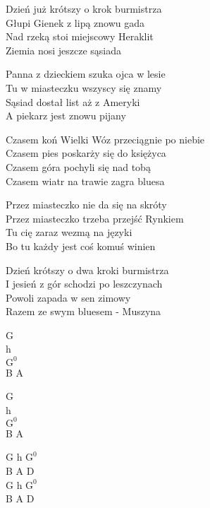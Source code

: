\begin{text}
    Dzień już krótszy o krok burmistrza\\
    Głupi Gienek z lipą znowu gada\\
    Nad rzeką stoi miejscowy Heraklit\\
    Ziemia nosi jeszcze sąsiada

    Panna z dzieckiem szuka ojca w lesie\\
    Tu w miasteczku wszyscy się znamy\\
    Sąsiad dostał list aż z Ameryki\\
    A piekarz jest znowu pijany

    Czasem koń Wielki Wóz przeciągnie po niebie\\
    Czasem pies poskarży się do księżyca\\
    Czasem góra pochyli się nad tobą\\
    Czasem wiatr na trawie zagra bluesa

    Przez miasteczko nie da się na skróty\\
    Przez miasteczko trzeba przejść Rynkiem\\
    Tu cię zaraz wezmą na języki\\
    Bo tu każdy jest coś komuś winien

    Dzień krótszy o dwa kroki burmistrza\\
    I jesień z gór schodzi po leszczynach\\
    Powoli zapada w sen zimowy\\
    Razem ze swym bluesem - Muszyna
\end{text}
\begin{chord}
    G\\
    h\\
    $\mathrm{G^{0}}$\\
    B A

    G\\
    h\\
    $\mathrm{G^{0}}$\\
    B A

    G h $\mathrm{G^{0}}$\\
    B A D\\
    G h $\mathrm{G^{0}}$\\
    B A D
\end{chord}
